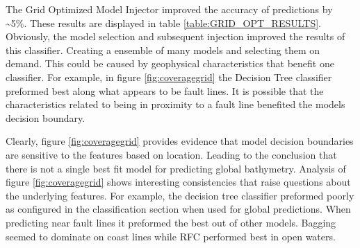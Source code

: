 \par
The Grid Optimized Model Injector improved the accuracy of predictions by \~{}5\%.
These results are displayed in table \ref{table:GRID_OPT_RESULTS}.
Obviously, the model selection and subsequent injection improved the results of this classifier.
Creating a ensemble of many models and selecting them on demand.
This could be caused by geophysical characteristics that benefit one classifier.
For example, in figure \ref{fig:coveragegrid} the Decision Tree classifier preformed best along what appears to be fault lines.
It is possible that the characteristics related to being in proximity to a fault line benefited the models decision boundary. 

\par
Clearly, figure \ref{fig:coveragegrid} provides evidence that model decision boundaries are sensitive to the features based on location.
Leading to the conclusion that there is not a single best fit model for predicting global bathymetry.
Analysis of figure \ref{fig:coveragegrid} shows interesting consistencies that raise questions about the underlying features.
For example, the decision tree classifier preformed poorly as configured in the classification section when used for global predictions.
When predicting near fault lines it preformed the best out of other models.
Bagging seemed to dominate on coast lines while \ac{RFC} performed best in open waters.



